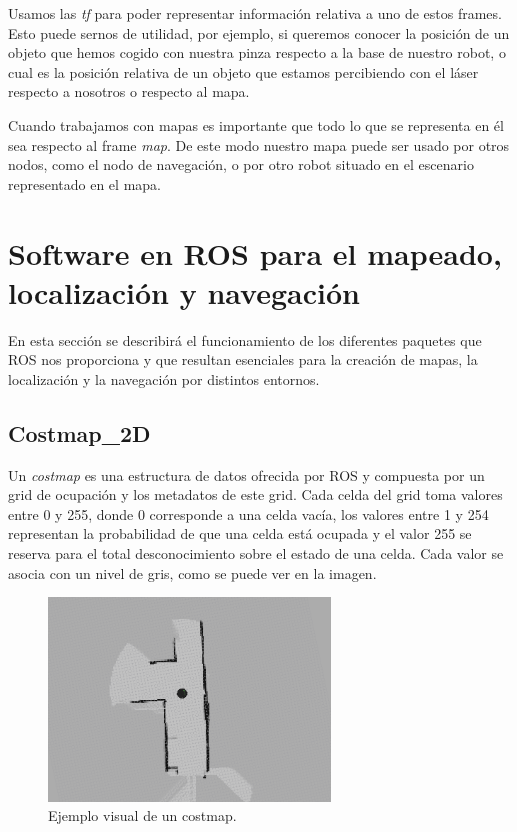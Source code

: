 Usamos las \textit{tf} para poder representar información relativa a uno de estos frames. Esto puede sernos de utilidad, por ejemplo, si queremos conocer la posición de un objeto que hemos cogido con nuestra pinza respecto a la base de nuestro robot, o cual es la posición relativa de un objeto que estamos percibiendo con el láser respecto a nosotros o respecto al mapa.

Cuando trabajamos con mapas es importante que todo lo que se representa en él sea respecto al frame \textit{map}. De este modo nuestro mapa puede ser usado por otros nodos, como el nodo de navegación, o por otro robot situado en el escenario representado en el mapa.


\section{Software en ROS para el mapeado, localización y navegación}
\label{cap:softwarederos}
En esta sección se describirá el funcionamiento de los diferentes paquetes que ROS nos proporciona y que resultan esenciales para la creación de mapas, la localización y la navegación por distintos entornos.

\subsection{Costmap\_2D}
\label{sec:costmap2d}
Un \textit{costmap} es una estructura de datos ofrecida por ROS y compuesta por un grid de ocupación y los metadatos de este grid. Cada celda del grid toma valores entre 0 y 255, donde 0 corresponde a una celda vacía, los valores entre 1 y 254 representan la probabilidad de que una celda está ocupada y el valor 255 se reserva para el total desconocimiento sobre el estado de una celda. Cada valor se asocia con un nivel de gris, como se puede ver en la imagen.
\begin{figure} [H]
  \begin{center}
    \includegraphics[width=7.5cm]{img/cap3/costmap-ejemplo}
  \end{center}
  \caption{Ejemplo visual de un costmap.}
  \label{fig:costmap-ejemplo}
\end{figure}\

